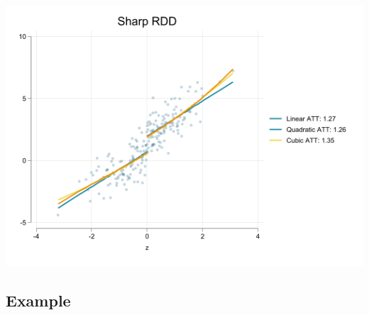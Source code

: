 \documentclass[
  letterpaper,
  DIV=11,
  numbers=noendperiod]{scrartcl}
\begin{document}
\includegraphics{11rdd_files/figure-pdf/cell-3-output-1.png}

\subsection{Example}\label{example-1}
\end{document}
